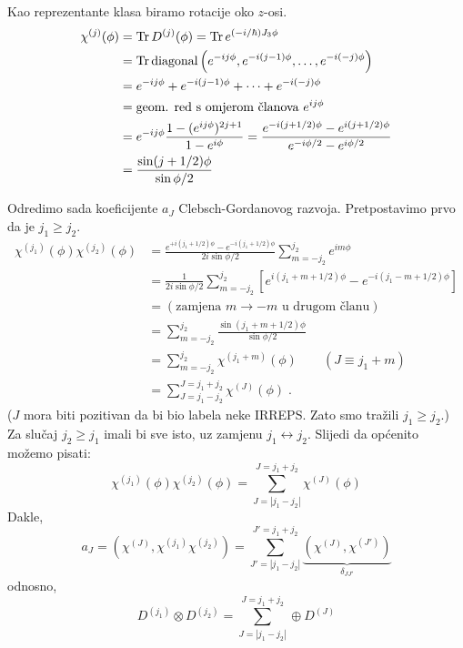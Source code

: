 Kao reprezentante klasa biramo rotacije oko $z$-osi.
\begin{equation}
\begin{split}
 \chi^{(j)}(\phi) &= \operatorname{Tr} D^{(j)}(\phi) = \operatorname{Tr} e^{(-i/\hbar)J_3 \phi} \\
 &= \operatorname{Tr} \textrm{diagonal}\left( e^{-i j\phi }, e^{-i (j-1)\phi}, \ldots,
e^{-i(-j)\phi}\right)\\
&= e^{-ij\phi } + e^{-i (j-1)\phi} + \cdots + e^{-i(-j)\phi}\\
&= \text{geom. red s omjerom članova $e^{i j\phi}$} \\
&= e^{-i j\phi} \frac{1- (e^{i j\phi})^{2j+1}}{1-e^{i\phi}}
= \frac{e^{-i(j+1/2)\phi} - e^{i(j+1/2)\phi}}{e^{-i\phi/2}-e^{i\phi/2}}\\
&= \frac{\sin(j+1/2)\phi}{\sin\phi/2}
\end{split}
\end{equation}


Odredimo sada koeficijente $a_J$ Clebsch-Gordanovog razvoja. Pretpostavimo
prvo da je $j_1 \ge j_2$.
\begin{equation}
\begin{split}
\chi^{(j_1)}(\phi)\chi^{(j_2)}(\phi)&=
 \frac{e^{+i(j_1+1/2)\phi} - e^{-i(j_1+1/2)\phi}}{2i\sin\phi/2}
\sum_{m=-j_2}^{j_2}e^{i m \phi}\\
&= \frac{1}{2 i \sin\phi/2} \sum_{m=-j_2}^{j_2}
\left[ e^{i(j_1+m+1/2)\phi} - e^{-i(j_1-m+1/2)\phi}\right]\\
&= (\text{zamjena $m\to -m$ u drugom članu}) \\
&=\sum_{m=-j_2}^{j_2} \frac{\sin(j_1+m+1/2)\phi}{\sin\phi/2}\\
&=\sum_{m=-j_2}^{j_2} \chi^{(j_1 + m)}(\phi) \qquad (J\equiv j_1 +m) \\
&=\sum_{J=j_1-j_2}^{J=j_1+j_2} \chi^{(J)}(\phi) \;.
\end{split}
\end{equation}
($J$ mora biti pozitivan da bi bio labela neke IRREPS. Zato smo
tražili $j_1\ge j_2$.)
Za slučaj $j_2 \ge j_1$ imali bi sve isto, uz zamjenu $j_1 \leftrightarrow
j_2$. Slijedi da općenito možemo pisati:
\begin{displaymath}
 \chi^{(j_1)}(\phi)\chi^{(j_2)}(\phi)=
\sum_{J=|j_1-j_2|}^{J=j_1+j_2} \chi^{(J)}(\phi)
\end{displaymath}
Dakle,
\begin{displaymath}
 a_J = \left(\chi^{(J)}, \chi^{(j_1)}\chi^{(j_2)}\right) =
 \sum_{J'=|j_1-j_2|}^{J'=j_1+j_2} 
\underbrace{\left(\chi^{(J)}, \chi^{(J')}\right)}_{\delta_{JJ'}}
\end{displaymath}
odnosno,
\begin{equation}
D^{(j_1)} \otimes D^{(j_2)} = \sum_{J=|j_1-j_2|}^{J=j_1+j_2} 
\oplus D^{(J)}
\end{equation}


